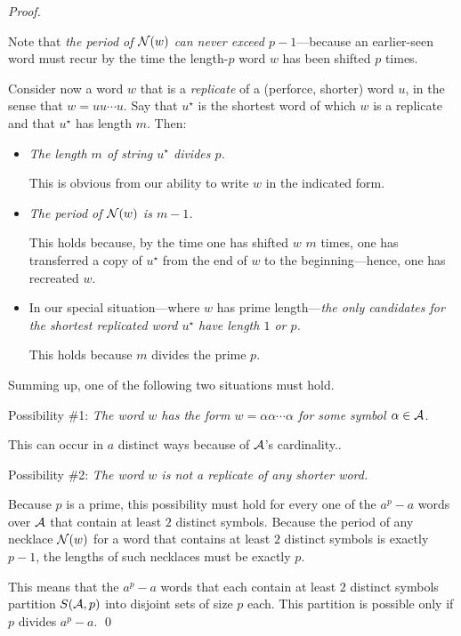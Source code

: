 \begin{proof}
\begin{itemize}
\smallskip

Note that {\em the period of $\mbox{$\cal N$}(w)$ can never exceed $p-1$}---because an earlier-seen word must recur by the time the length-$p$ word $w$ has been shifted $p$ times.
\end{itemize}

Consider now a word $w$ that is a {\it replicate} of a (perforce, shorter) word $u$, in the sense that $w = uu \cdots u$.  Say that $u^\star$ is the shortest word of which $w$ is a replicate and that $u^\star$ has length $m$.  Then:
\begin{itemize}
\item
{\em The length $m$ of string $u^\star$ divides $p$.}

\smallskip

This is obvious from our ability to write $w$ in the indicated form.

\medskip\item
{\em The period of $\mbox{$\cal N$}(w)$ is $m-1$.}

\smallskip

This holds because, by the time one has shifted $w$ $m$ times, one has transferred a copy of $u^\star$ from the end of $w$ to the beginning---hence, one has recreated $w$.

\medskip\item
In our special situation---where $w$ has prime length---{\em the only candidates for the shortest replicated word $u^\star$ have length $1$ or $p$.}

\smallskip

This holds because $m$ divides the prime $p$.
\end{itemize}
Summing up, one of the following two situations must hold.

\medskip

\noindent
Possibility \#1:
{\em The word $w$ has the form $w = \alpha \alpha \cdots \alpha$ for some symbol $\alpha \in \mbox{$\cal A$}$.}

This can occur in $a$ distinct ways because of $\mbox{$\cal A$}$'s cardinality..

\medskip

\noindent
Possibility \#2:
{\em The word $w$ is not a replicate of any shorter word.}

\smallskip

Because $p$ is a prime, this possibility must hold for every one of the $a^p - a$ words over $\mbox{$\cal A$}$ that contain at least $2$ distinct symbols.  Because the period of any necklace $\mbox{$\cal N$}(w)$ for a word that contains at least $2$ distinct symbols is exactly $p-1$, the lengths of such necklaces must be exactly $p$.

This means that the $a^p - a$ words that each contain at least $2$ distinct symbols partition $S(\mbox{$\cal A$}, p)$ into disjoint sets of size $p$ each.  This partition is possible only if $p$ divides $a^p - a$.  \qed
\end{proof}

